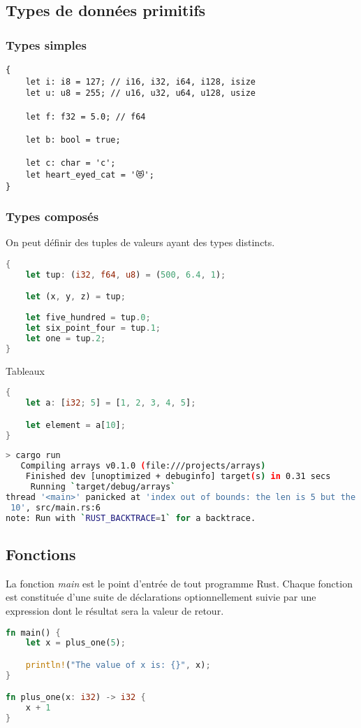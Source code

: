 \subsection{Types de données primitifs}
\begin{frame}[fragile]
  \frametitle{Types simples}
  \begin{lstlisting}
{
    let i: i8 = 127; // i16, i32, i64, i128, isize
    let u: u8 = 255; // u16, u32, u64, u128, usize
    
    let f: f32 = 5.0; // f64
    
    let b: bool = true;
    
    let c: char = 'c';
    let heart_eyed_cat = '😻';
}
  \end{lstlisting}
\end{frame}

\begin{frame}[fragile]
  \frametitle{Types composés}
On peut définir des tuples de valeurs ayant des types distincts.
  \begin{lstlisting}[language=rust]
{
    let tup: (i32, f64, u8) = (500, 6.4, 1);

    let (x, y, z) = tup;
    
    let five_hundred = tup.0;
    let six_point_four = tup.1;
    let one = tup.2;
}
  \end{lstlisting}
\end{frame}

\begin{frame}[fragile]
Tableaux
  \begin{lstlisting}[language=rust]
{
    let a: [i32; 5] = [1, 2, 3, 4, 5];

    let element = a[10];
}
  \end{lstlisting}
  \begin{lstlisting}[language=bash, basicstyle=\tiny{}]
> cargo run
   Compiling arrays v0.1.0 (file:///projects/arrays)
    Finished dev [unoptimized + debuginfo] target(s) in 0.31 secs
     Running `target/debug/arrays`
thread '<main>' panicked at 'index out of bounds: the len is 5 but the index is
 10', src/main.rs:6
note: Run with `RUST_BACKTRACE=1` for a backtrace.
  \end{lstlisting}
\end{frame}

\subsection{Fonctions}
\begin{frame}[fragile]
  La fonction \textit{main} est le point d'entrée de tout programme Rust.
Chaque fonction est constituée d'une suite de déclarations optionnellement suivie par une expression dont le résultat sera la valeur de retour.
\begin{lstlisting}[language=rust]
fn main() {
    let x = plus_one(5);

    println!("The value of x is: {}", x);
}

fn plus_one(x: i32) -> i32 {
    x + 1
}
\end{lstlisting}  
\end{frame}


